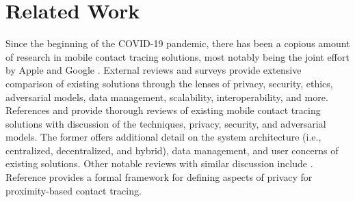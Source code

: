 \chapter{Related Work}
\par Since the beginning of the COVID-19 pandemic, there has been a copious amount of research in mobile contact tracing solutions, most notably being the joint effort by Apple and Google \cite{AppleGoogle}. External reviews and surveys provide extensive comparison of existing solutions through the lenses of privacy, security, ethics, adversarial models, data management, scalability, interoperability, and more. References \cite{Ahmed2020} and \cite{Martin2020} provide thorough reviews of existing mobile contact tracing solutions with discussion of the techniques, privacy, security, and adversarial models. The former offers additional detail on the system architecture (i.e., centralized, decentralized, and hybrid), data management, and user concerns of existing solutions. Other notable reviews with similar discussion include \cite{Wen2020, Raskar2020, Cho2020, Dar2020, Lucivero2020}. Reference \cite{Kuhn2021} provides a formal framework for defining aspects of privacy for proximity-based contact tracing.